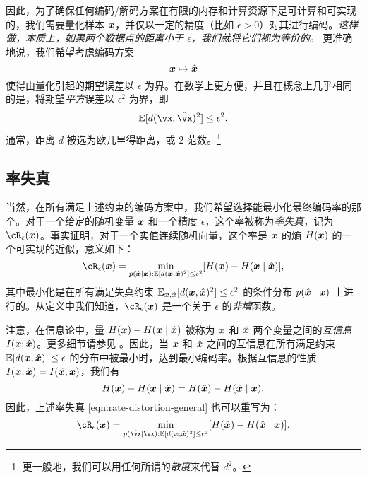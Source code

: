 \documentclass[../../book-main.tex]{subfiles}
\begin{document}
因此，为了确保任何编码/解码方案在有限的内存和计算资源下是可计算和可实现的，我们需要量化样本 $\bm{x}$，并仅以一定的精度（比如 $\epsilon > 0$）对其进行编码。{\em 这样做，本质上，如果两个数据点的距离小于 $\epsilon$，我们就将它们视为等价的。} 更准确地说，我们希望考虑编码方案
\begin{equation}
	\bm{x} \mapsto \hat {\bm{x}}
\end{equation}
使得由量化引起的期望误差以 $\epsilon$ 为界。在数学上更方便，并且在概念上几乎相同的是，将期望\textit{平方}误差以 \(\epsilon^{2}\) 为界，即
\begin{equation}
	\Ex[d(\vx, \hat \vx)^{2}] \le \epsilon^{2}.
\end{equation}
通常，距离 \(d\) 被选为欧几里得距离，或 2-范数。\footnote{更一般地，我们可以用任何所谓的\textit{散度}来代替 \(d^{2}\)。}

\subsection{率失真}
当然，在所有满足上述约束的编码方案中，我们希望选择能最小化最终编码率的那个。对于一个给定的随机变量 $\bm{x}$ 和一个精度 $\epsilon$，这个率被称为{\em 率失真}，记为 $\cR_{\epsilon}(\x)$。事实证明，对于一个实值连续随机向量，这个率是 $\bm{x}$ 的熵 $H(\bm{x})$ 的一个可实现的近似，意义如下：
\begin{equation}
	\cR_{\epsilon}(\x) = \min_{p(\hat \x \mid \x): \Ex[d(\x, \hat \x)^{2}] \le \epsilon^{2}} [H(\x) - H(\x \mid \hat{\x})],
    \label{eqn:rate-distortion-general}
\end{equation}
其中最小化是在所有满足失真约束 $\operatorname{\mathbb{E}}_{\bm{x}, \hat {\bm{x}}}[d(\bm{x}, \hat {\bm{x}})^{2}] \le \epsilon^{2}$ 的条件分布 $p(\hat {\bm{x}} \mid \bm{x})$ 上进行的。从定义中我们知道，$\cR_{\epsilon}(\x)$ 是一个关于 $\epsilon$ 的{\em 非增}函数。

\begin{remark}
	注意，在信息论中，量 $H(\bm{x}) - H(\bm{x} \mid \hat {\bm{x}})$ 被称为 $\bm{x}$ 和 $\hat {\bm{x}}$ 两个变量之间的{\em 互信息} $I(\bm{x}; \hat {\bm{x}})$。更多细节请参见 \cite{Cover-Thomas}。因此，当 $\bm{x}$ 和 $\hat {\bm{x}}$ 之间的互信息在所有满足约束 $\mathbb{E} [d(\bm{x}, \hat {\bm{x}})] \le \epsilon$ 的分布中被最小时，达到最小编码率。根据互信息的性质 $I(\bm{x}; \hat {\bm{x}}) = I(\hat {\bm{x}}; \bm{x})$，我们有
	\begin{equation}
        H(\bm{x}) - H(\bm{x} \mid \hat{\bm{x}}) = H(\hat{\bm{x}}) - H(\hat{\bm{x}} \mid {\bm{x}}).
    \end{equation}
    因此，上述率失真 \eqref{eqn:rate-distortion-general} 也可以重写为：
    \begin{equation}
		\cR_{\epsilon}(\x) = \min_{p(\hat \vx \mid \vx): \mathbb{E} [d(\x, \hat \x)^{2}] \le \epsilon^{2}} [H(\hat \x) - H(\hat \x \mid \x)].  \label{eqn:rate-distortion-general-2}
	\end{equation}
\end{remark}
\end{document}
